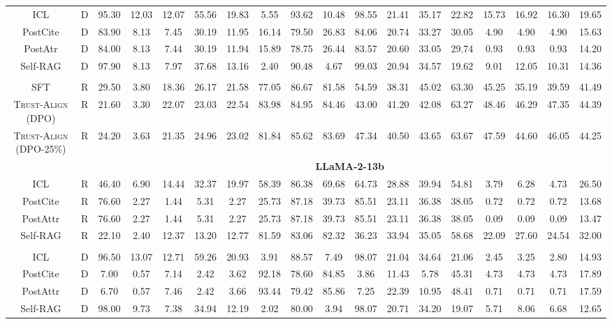 \documentclass{article} %
\newcommand{\method}[0]{\textsc{Trust-Align}}
\begin{document}
\begin{table}[htb!]
{\begin{tabular}{ccc*{15}c}
ICL & D & 95.30 & 12.03 & 12.07 & 55.56 & 19.83 & 5.55 & 93.62 & 10.48 & 98.55 & 21.41 & 35.17 & 22.82 & 15.73 & 16.92 & 16.30 & 19.65 \\
PostCite & D & 83.90 & 8.13 & 7.45 & 30.19 & 11.95 & 16.14 & 79.50 & 26.83 & 84.06 & 20.74 & 33.27 & 30.05 & 4.90 & 4.90 & 4.90 & 15.63 \\
PostAtr & D & 84.00 & 8.13 & 7.44 & 30.19 & 11.94 & 15.89 & 78.75 & 26.44 & 83.57 & 20.60 & 33.05 & 29.74 & 0.93 & 0.93 & 0.93 & 14.20 \\
Self-RAG & D & 97.90 & 8.13 & 7.97 & 37.68 & 13.16 & 2.40 & 90.48 & 4.67 & 99.03 & 20.94 & 34.57 & 19.62 & 9.01 & 12.05 & 10.31 & 14.36 \\\\

SFT & R & 29.50 & 3.80 & 18.36 & 26.17 & 21.58 & 77.05 & 86.67 & 81.58 & 54.59 & 38.31 & 45.02 & 63.30 & 45.25 & 35.19 & 39.59 & 41.49 \\
\method{} (DPO) & R & 21.60 & 3.30 & 22.07 & 23.03 & 22.54 & 83.98 & 84.95 & 84.46 & 43.00 & 41.20 & 42.08 & 63.27 & 48.46 & 46.29 & 47.35 & 44.39 \\
\method{} (DPO-25\%) & R & 24.20 & 3.63 & 21.35 & 24.96 & 23.02 & 81.84 & 85.62 & 83.69 & 47.34 & 40.50 & 43.65 & 63.67 & 47.59 & 44.60 & 46.05 & 44.25 \\

& & \multicolumn{16}{c}{\cellcolor[gray]{0.9}\textbf{LLaMA-2-13b}} \\
ICL & R & 46.40 & 6.90 & 14.44 & 32.37 & 19.97 & 58.39 & 86.38 & 69.68 & 64.73 & 28.88 & 39.94 & 54.81 & 3.79 & 6.28 & 4.73 & 26.50 \\
PostCite & R & 76.60 & 2.27 & 1.44 & 5.31 & 2.27 & 25.73 & 87.18 & 39.73 & 85.51 & 23.11 & 36.38 & 38.05 & 0.72 & 0.72 & 0.72 & 13.68 \\
PostAttr & R & 76.60 & 2.27 & 1.44 & 5.31 & 2.27 & 25.73 & 87.18 & 39.73 & 85.51 & 23.11 & 36.38 & 38.05 & 0.09 & 0.09 & 0.09 & 13.47 \\
Self-RAG & R & 22.10 & 2.40 & 12.37 & 13.20 & 12.77 & 81.59 & 83.06 & 82.32 & 36.23 & 33.94 & 35.05 & 58.68 & 22.09 & 27.60 & 24.54 & 32.00 \\\\

ICL & D & 96.50 & 13.07 & 12.71 & 59.26 & 20.93 & 3.91 & 88.57 & 7.49 & 98.07 & 21.04 & 34.64 & 21.06 & 2.45 & 3.25 & 2.80 & 14.93 \\
PostCite & D & 7.00 & 0.57 & 7.14 & 2.42 & 3.62 & 92.18 & 78.60 & 84.85 & 3.86 & 11.43 & 5.78 & 45.31 & 4.73 & 4.73 & 4.73 & 17.89 \\
PostAttr & D & 6.70 & 0.57 & 7.46 & 2.42 & 3.66 & 93.44 & 79.42 & 85.86 & 7.25 & 22.39 & 10.95 & 48.41 & 0.71 & 0.71 & 0.71 & 17.59 \\
Self-RAG & D & 98.00 & 9.73 & 7.38 & 34.94 & 12.19 & 2.02 & 80.00 & 3.94 & 98.07 & 20.71 & 34.20 & 19.07 & 5.71 & 8.06 & 6.68 & 12.65 \\


\end{tabular}}
\end{table}
\end{document}
